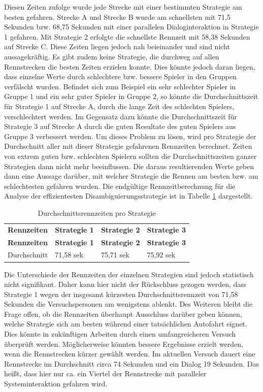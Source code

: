 \documentclass[12pt,a4paper]{scrartcl}
\begin{document}
Diesen Zeiten zufolge wurde jede Strecke mit einer bestimmten Strategie am besten gefahren. Strecke A  und Strecke B wurde am schnellsten mit 71,5 Sekunden bzw. 68,75 Sekunden mit einer parallelen Dialoginteraktion in Strategie 1 gefahren. Mit Strategie 2 erfolgte die schnellste Rennzeit mit 58,38 Sekunden auf Strecke C. Diese Zeiten liegen jedoch nah beieinander und sind nicht aussagekräftig. Es gibt zudem keine Strategie, die durchweg auf allen Rennstrecken die besten Zeiten erzielen konnte. Dies könnte jedoch daran liegen, dass einzelne Werte durch schlechtere bzw. bessere Spieler in den Gruppen verfälscht wurden.
Befindet sich zum Beispiel ein sehr schlechter Spieler in Gruppe 1 und ein sehr guter Spieler in Gruppe 2, so könnte die Durchschnittszeit für Strategie 1 auf Strecke A, durch die lange Zeit des schlechten Spielers, verschlechtert werden. Im Gegensatz dazu könnte die Durchschnittszeit für Strategie 3 auf Strecke A durch die guten Resultate des guten Spielers aus Gruppe 3 verbessert werden. Um dieses Problem zu lösen, wird pro Strategie der Durchschnitt aller mit dieser Strategie gefahrenen Rennzeiten berechnet. Zeiten von extrem guten bzw. schlechten Spielern sollten die Durchschnittszeiten ganzer Strategien dann nicht mehr beeinflussen. Die daraus resultierenden Werte geben dann eine Aussage darüber, mit welcher Strategie die Rennen am besten bzw. am schlechtesten gefahren wurden. 
Die endgültige Rennzeitberechnung für die Analyse der effizientesten Disambiguierungsstrategie ist in Tabelle \ref{RennZeitenDis1} dargestellt.

\begin{longtable}{p{3cm}p{3cm}p{3cm}p{3cm} }
	\label{RennZeitenDis1}\\
	\caption[Durchschnittsrennzeiten pro Strategie]{Durchschnittsrennzeiten pro Strategie}\\
	\hline
	\textbf{Rennzeiten}&\textbf{Strategie 1}&\textbf{Strategie 2} &\textbf{Strategie 3}\\
	\hline
	\endfirsthead
	\hline
	\textbf{Rennzeiten}&\textbf{Strategie 1}&\textbf{Strategie 2} &\textbf{Strategie 3}\\
	\hline
	\endhead
Durchschnitt & 71,58 sek & 75,71 sek & 75,92 sek\\
\hline
\end{longtable}
Die Unterschiede der Rennzeiten der einzelnen Strategien sind jedoch statistisch nicht signifikant. Daher kann hier nicht der Rückschluss gezogen werden, dass Strategie 1 wegen der insgesamt kürzesten Durchschnittsrennzeit von 71,58 Sekunden die Versuchspersonen am wenigstens ablenkt. Des Weiteren bleibt die Frage offen, ob die Rennzeiten überhaupt Ausschluss darüber geben können, welche Strategie sich am besten während einer tatsächlichen Autofahrt eignet. Dies könnte in zukünftigen Arbeiten durch einen umfangreicheren Versuch überprüft werden. Möglicherweise könnten bessere Ergebnisse erzielt werden, wenn die Rennstrecken kürzer gewählt werden. Im aktuellen Versuch dauert eine Rennstrecke im Durchschnitt circa 74 Sekunden und ein Dialog 19 Sekunden. Das heißt, dass hier nur ca. ein Viertel der Rennstrecke mit paralleler Systeminteraktion gefahren wird.
\end{document}
